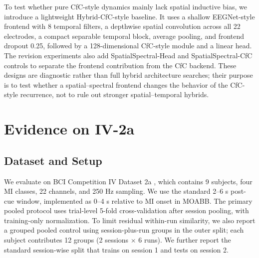 \documentclass[journal]{IEEEtran}
\begin{document}
To test whether pure CfC-style dynamics mainly lack spatial inductive bias, we introduce a lightweight Hybrid-CfC-style baseline. It uses a shallow EEGNet-style frontend with 8 temporal filters, a depthwise spatial convolution across all 22 electrodes, a compact separable temporal block, average pooling, and frontend dropout 0.25, followed by a 128-dimensional CfC-style module and a linear head. The revision experiments also add SpatialSpectral-Head and SpatialSpectral-CfC controls to separate the frontend contribution from the CfC backend. These designs are diagnostic rather than full hybrid architecture searches; their purpose is to test whether a spatial--spectral frontend changes the behavior of the CfC-style recurrence, not to rule out stronger spatial--temporal hybrids.

\section{Evidence on IV-2a}

\subsection{Dataset and Setup}
We evaluate on BCI Competition IV Dataset 2a \cite{tangermann2012bci4}, which contains 9 subjects, four MI classes, 22 channels, and 250 Hz sampling. We use the standard 2--6 s post-cue window, implemented as 0--4 s relative to MI onset in MOABB. The primary pooled protocol uses trial-level 5-fold cross-validation after session pooling, with training-only normalization. To limit residual within-run similarity, we also report a grouped pooled control using session-plus-run groups in the outer split; each subject contributes 12 groups (2 sessions $\times$ 6 runs). We further report the standard session-wise split that trains on session 1 and tests on session 2.
\end{document}
